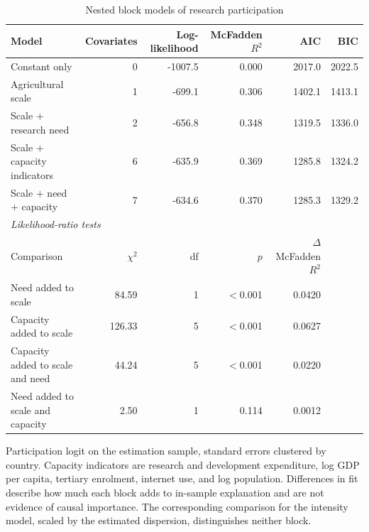\documentclass[ASNA,twocolumn]{USG}
\begin{document}
\begin{table}[!t]
\centering
\footnotesize
\caption{Nested block models of research participation}
\label{tab:blocks}
\begin{tabular*}{\textwidth}{@{\extracolsep\fill}l r r r r r@{}}
\toprule
Model & Covariates & Log-likelihood & McFadden $R^2$ & AIC & BIC \\
\midrule
Constant only & 0 & -1007.5 & 0.000 & 2017.0 & 2022.5 \\
Agricultural scale & 1 & -699.1 & 0.306 & 1402.1 & 1413.1 \\
Scale $+$ research need & 2 & -656.8 & 0.348 & 1319.5 & 1336.0 \\
Scale $+$ capacity indicators & 6 & -635.9 & 0.369 & 1285.8 & 1324.2 \\
Scale $+$ need $+$ capacity & 7 & -634.6 & 0.370 & 1285.3 & 1329.2 \\
\midrule
\multicolumn{6}{l}{\textit{Likelihood-ratio tests}} \\
Comparison & $\chi^2$ & df & $p$ & $\Delta$ McFadden $R^2$ & \\
Need added to scale & 84.59 & 1 & $<$0.001 & 0.0420 & \\
Capacity added to scale & 126.33 & 5 & $<$0.001 & 0.0627 & \\
Capacity added to scale and need & 44.24 & 5 & $<$0.001 & 0.0220 & \\
Need added to scale and capacity & 2.50 & 1 & 0.114 & 0.0012 & \\
\bottomrule
\end{tabular*}
\begin{tablenotes}
\item[] Participation logit on the estimation sample, standard errors clustered by country. Capacity indicators are research and development expenditure, log GDP per capita, tertiary enrolment, internet use, and log population. Differences in fit describe how much each block adds to in-sample explanation and are not evidence of causal importance. The corresponding comparison for the intensity model, scaled by the estimated dispersion, distinguishes neither block.
\end{tablenotes}
\end{table}
\end{document}
